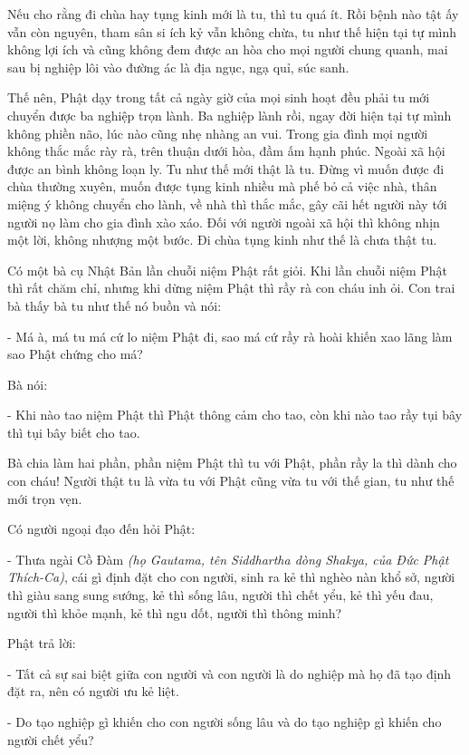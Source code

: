 \documentclass[
  12pt,
  oneside]{book}
\begin{document}
Nếu cho rằng đi chùa hay tụng kinh mới là tu, thì tu quá ít. Rồi bệnh nào tật ấy vẫn còn nguyên, tham sân si ích kỷ vẫn không chừa, tu như thế hiện tại tự mình không lợi ích và cũng không đem được an hòa cho mọi người chung quanh, mai sau bị nghiệp lôi vào đường ác là địa ngục, ngạ quỉ, súc sanh.

Thế nên, Phật dạy trong tất cả ngày giờ của mọi sinh hoạt đều phải tu mới chuyển được ba nghiệp trọn lành. Ba nghiệp lành rồi, ngay đời hiện tại tự mình không phiền não, lúc nào cũng nhẹ nhàng an vui. Trong gia đình mọi người không thắc mắc rày rà, trên thuận dưới hòa, đầm ấm hạnh phúc. Ngoài xã hội được an bình không loạn ly. Tu như thế mới thật là tu. Đừng vì muốn được đi chùa thường xuyên, muốn được tụng kinh nhiều mà phế bỏ cả việc nhà, thân miệng ý không chuyển cho lành, về nhà thì thắc mắc, gây cãi hết người này tới người nọ làm cho gia đình xào xáo. Đối với người ngoài xã hội thì không nhịn một lời, không nhượng một bước. Đi chùa tụng kinh như thế là chưa thật tu.

Có một bà cụ Nhật Bản lần chuỗi niệm Phật rất giỏi. Khi lần chuỗi niệm Phật thì rất chăm chỉ, nhưng khi dừng niệm Phật thì rầy rà con cháu inh ỏi. Con trai bà thấy bà tu như thế nó buồn và nói:

- Má à, má tu má cứ lo niệm Phật đi, sao má cứ rầy rà hoài khiến xao lãng làm sao Phật chứng cho má?

Bà nói:

- Khi nào tao niệm Phật thì Phật thông cảm cho tao, còn khi nào tao rầy tụi bây thì tụi bây biết cho tao.

Bà chia làm hai phần, phần niệm Phật thì tu với Phật, phần rầy la thì dành cho con cháu! Người thật tu là vừa tu với Phật cũng vừa tu với thế gian, tu như thế mới trọn vẹn.

Có người ngoại đạo đến hỏi Phật:

- Thưa ngài Cồ Đàm \emph{(họ Gautama, tên Siddhartha dòng Shakya, của Đức Phật Thích-Ca)}, cái gì định đặt cho con người, sinh ra kẻ thì nghèo nàn khổ sở, người thì giàu sang sung sướng, kẻ thì sống lâu, người thì chết yểu, kẻ thì yếu đau, người thì khỏe mạnh, kẻ thì ngu dốt, người thì thông minh?

Phật trả lời:

- Tất cả sự sai biệt giữa con người và con người là do nghiệp mà họ đã tạo định đặt ra, nên có người ưu kẻ liệt.

- Do tạo nghiệp gì khiến cho con người sống lâu và do tạo nghiệp gì khiến cho người chết yểu?
\end{document}
